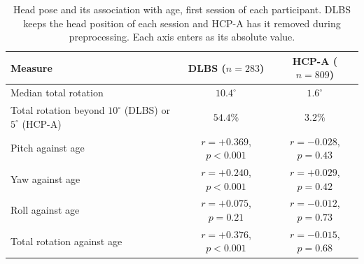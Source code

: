 \begin{table}[pos=tb]
\caption{Head pose and its association with age, first session of each participant. DLBS keeps the head position of each session and HCP-A has it removed during preprocessing. Each axis enters as its absolute value.}
\label{tbl:pose-age}
\begin{tabular*}{\tblwidth}{@{}LCC@{}}
\toprule
\textbf{Measure} & \textbf{DLBS ($n=283$)} & \textbf{HCP-A ($n=809$)} \\
\midrule
Median total rotation & $10.4^{\circ}$ & $1.6^{\circ}$ \\
Total rotation beyond $10^{\circ}$ (DLBS) or $5^{\circ}$ (HCP-A) & $54.4\%$ & $3.2\%$ \\
Pitch against age & $r=+0.369$, $p<0.001$ & $r=-0.028$, $p=0.43$ \\
Yaw against age & $r=+0.240$, $p<0.001$ & $r=+0.029$, $p=0.42$ \\
Roll against age & $r=+0.075$, $p=0.21$ & $r=-0.012$, $p=0.73$ \\
Total rotation against age & $r=+0.376$, $p<0.001$ & $r=-0.015$, $p=0.68$ \\
\bottomrule
\end{tabular*}
\end{table}

